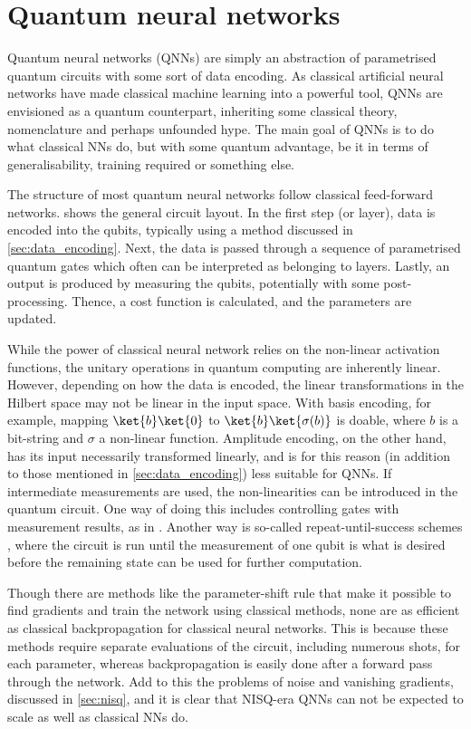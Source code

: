 \section{Quantum neural networks}
Quantum neural networks (QNNs) are simply an abstraction of parametrised quantum circuits with some sort of data encoding.
As classical artificial neural networks have made classical machine learning into a powerful tool, QNNs are envisioned as a quantum counterpart, inheriting some classical theory, nomenclature and perhaps unfounded hype.
The main goal of QNNs is to do what classical NNs do, but with some quantum advantage, be it in terms of generalisability, training required or something else.

The structure of most quantum neural networks follow classical feed-forward networks.
 shows the general circuit layout.
In the first step (or layer), data is encoded into the qubits, typically using a method discussed in \cref{sec:data_encoding}.
Next, the data is passed through a sequence of parametrised quantum gates which often can be interpreted as belonging to layers.
Lastly, an output is produced by measuring the qubits, potentially with some post-processing.
Thence, a cost function is calculated, and the parameters are updated.

While the power of classical neural network relies on the non-linear activation functions, the unitary operations in quantum computing are inherently linear.
However, depending on how the data is encoded, the linear transformations in the Hilbert space may not be linear in the input space.
With basis encoding, for example, mapping $\ket{b}\ket{0}$ to $\ket{b}\ket{\sigma(b)}$ is doable, where $b$ is a bit-string and $\sigma$ a non-linear function.
Amplitude encoding, on the other hand, has its input necessarily transformed linearly, and is for this reason (in addition to those mentioned in \cref{sec:data_encoding}) less suitable for QNNs.
If intermediate measurements are used, the non-linearities can be introduced in the quantum circuit.
One way of doing this includes controlling gates with measurement results, as in \cite{cong2019}.
Another way is so-called repeat-until-success schemes \cite{cao2017}, where the circuit is run until the measurement of one qubit is what is desired before the remaining state can be used for further computation.

Though there are methods like the parameter-shift rule that make it possible to find gradients and train the network using classical methods, none are as efficient as classical backpropagation for classical neural networks.
This is because these methods require separate evaluations of the circuit, including numerous shots, for each parameter, whereas backpropagation is easily done after a forward pass through the network.
Add to this the problems of noise and vanishing gradients, discussed in \cref{sec:nisq}, and it is clear that NISQ-era QNNs can not be expected to scale as well as classical NNs do.

